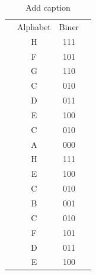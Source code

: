 \begin{table}[htbp]
	\centering
	\caption{Add caption}
	\begin{tabular}{rlll}
		\cline{2-3}    \multicolumn{1}{r|}{} & \multicolumn{1}{c|}{Alphabet} & \multicolumn{1}{c|}{Biner} &  \bigstrut\\
		\cline{2-3}    \multicolumn{1}{r|}{} & \multicolumn{1}{c|}{H} & \multicolumn{1}{c|}{111} &  \bigstrut\\
		\cline{2-3}    \multicolumn{1}{r|}{} & \multicolumn{1}{c|}{F} & \multicolumn{1}{c|}{101} &  \bigstrut\\
		\cline{2-3}    \multicolumn{1}{r|}{} & \multicolumn{1}{c|}{G} & \multicolumn{1}{c|}{110} &  \bigstrut\\
		\cline{2-3}    \multicolumn{1}{r|}{} & \multicolumn{1}{c|}{C} & \multicolumn{1}{c|}{010} &  \bigstrut\\
		\cline{2-3}    \multicolumn{1}{r|}{} & \multicolumn{1}{c|}{D} & \multicolumn{1}{c|}{011} &  \bigstrut\\
		\cline{2-3}    \multicolumn{1}{r|}{} & \multicolumn{1}{c|}{E} & \multicolumn{1}{c|}{100} &  \bigstrut\\
		\cline{2-3}    \multicolumn{1}{r|}{} & \multicolumn{1}{c|}{C} & \multicolumn{1}{c|}{010} &  \bigstrut\\
		\cline{2-3}    \multicolumn{1}{r|}{} & \multicolumn{1}{c|}{A} & \multicolumn{1}{c|}{000} &  \bigstrut\\
		\cline{2-3}    \multicolumn{1}{r|}{} & \multicolumn{1}{c|}{H} & \multicolumn{1}{c|}{111} &  \bigstrut\\
		\cline{2-3}    \multicolumn{1}{r|}{} & \multicolumn{1}{c|}{E} & \multicolumn{1}{c|}{100} &  \bigstrut\\
		\cline{2-3}    \multicolumn{1}{r|}{} & \multicolumn{1}{c|}{C} & \multicolumn{1}{c|}{010} &  \bigstrut\\
		\cline{2-3}    \multicolumn{1}{r|}{} & \multicolumn{1}{c|}{B} & \multicolumn{1}{c|}{001} &  \bigstrut\\
		\cline{2-3}    \multicolumn{1}{r|}{} & \multicolumn{1}{c|}{C} & \multicolumn{1}{c|}{010} &  \bigstrut\\
		\cline{2-3}    \multicolumn{1}{r|}{} & \multicolumn{1}{c|}{F} & \multicolumn{1}{c|}{101} &  \bigstrut\\
		\cline{2-3}    \multicolumn{1}{r|}{} & \multicolumn{1}{c|}{D} & \multicolumn{1}{c|}{011} &  \bigstrut\\
		\cline{2-3}    \multicolumn{1}{r|}{} & \multicolumn{1}{c|}{E} & \multicolumn{1}{c|}{100} &  \bigstrut\\

\end{tabular}
\end{table}
